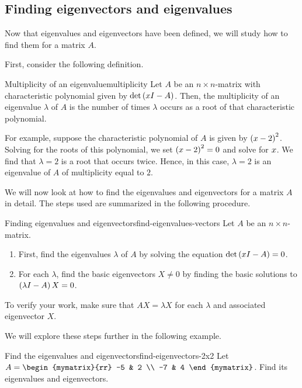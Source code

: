 \subsection{Finding eigenvectors and eigenvalues}

Now that eigenvalues and eigenvectors have been defined, we will study how to find
 them for a matrix $A$. 

First, consider the following definition.

\begin{definition}{Multiplicity of an eigenvalue}{multiplicity}
Let $A$ be an $n \times n$-matrix with characteristic polynomial given by 
$\det \left(x I -  A\right)$. Then, the multiplicity of an eigenvalue $\lambda$ of $A$
is the number of times $\lambda$ occurs as a root of that characteristic polynomial.
\end{definition}

For example, suppose the characteristic polynomial of $A$ is given by
$\left(x - 2 \right)^2$. Solving for the roots of this
polynomial, we set $\left(x - 2 \right)^2 = 0$ and solve for
$x$.  We find that $\lambda = 2$ is a root that occurs
twice. Hence, in this case, $\lambda = 2$ is an eigenvalue of $A$ of
multiplicity equal to $2$.

We will now look at how to find the eigenvalues and eigenvectors for a
matrix $A$ in detail.  The steps used are summarized in the following
procedure.

\begin{procedure}{Finding eigenvalues and eigenvectors}{find-eigenvalues-vectors}
%
Let $A$ be an $n \times n$-matrix. 
\begin{enumerate}
\item First, find the eigenvalues $\lambda$ of $A$ by solving the equation $\det \left(x I -A \right) = 0$. 

\item For each $\lambda$, find the basic eigenvectors $X \neq 0$ by finding the basic solutions to  $\left(\lambda I - A \right) X = 0$.
\end{enumerate}

To verify your work, make sure that $AX=\lambda X$
for each $\lambda$ and associated eigenvector $X$.
\end{procedure}

We will explore these steps further in the following example.

\begin{example}{Find the eigenvalues and eigenvectors}{find-eigenvectors-2x2}
Let $A = \begin{mymatrix}{rr}
-5 & 2 \\
-7 & 4 
\end{mymatrix}$. Find its eigenvalues and eigenvectors. 
\end{example}

